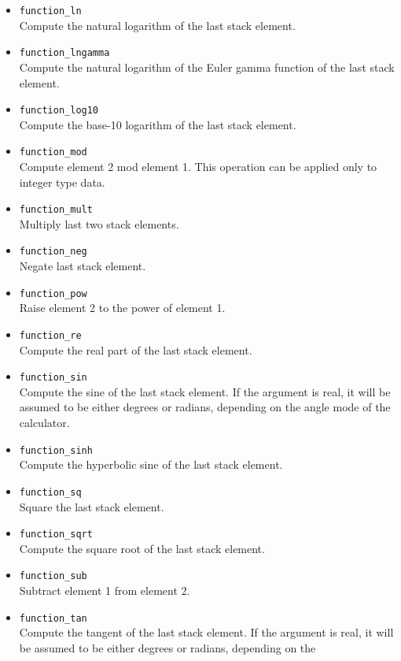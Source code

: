 \documentclass[11pt,notitlepage]{article}
\begin{document}
\begin{itemize}
   \item {\tt function\_ln} \\
      Compute the natural logarithm of the last stack element.
   \item {\tt function\_lngamma} \\
      Compute the natural logarithm of the Euler gamma function of the last
      stack element.
   \item {\tt function\_log10} \\
      Compute the base-10 logarithm of the last stack element.
   \item {\tt function\_mod} \\
      Compute element 2 mod element 1.  This operation can be applied only
      to integer type data.
   \item {\tt function\_mult} \\
      Multiply last two stack elements.
   \item {\tt function\_neg} \\
      Negate last stack element.
   \item {\tt function\_pow} \\
      Raise element 2 to the power of element 1.
   \item {\tt function\_re} \\
      Compute the real part of the last stack element.
   \item {\tt function\_sin} \\
      Compute the sine of the last stack element.  If the argument is real, it
      will be assumed to be either degrees or radians, depending on the angle
      mode of the calculator.
   \item {\tt function\_sinh} \\
      Compute the hyperbolic sine of the last stack element.
   \item {\tt function\_sq} \\
      Square the last stack element.
   \item {\tt function\_sqrt} \\
      Compute the square root of the last stack element.
   \item {\tt function\_sub} \\
      Subtract element 1 from element 2.
   \item {\tt function\_tan} \\
      Compute the tangent of the last stack element.  If the argument is real,
      it will be assumed to be either degrees or radians, depending on the

\end{itemize}
\end{document}
